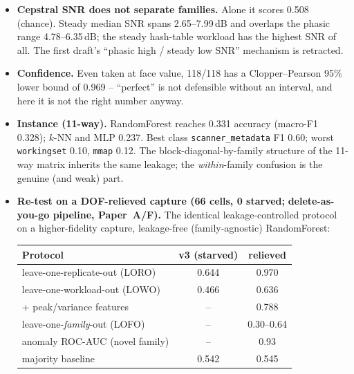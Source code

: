 \documentclass[conference]{IEEEtran}
\begin{document}
\begin{itemize}
        bootstrap puts agnostic accuracy at 0.645 with 95\% CI $[0.541, 0.746]$,
        whose lower bound coincides with the baseline -- so no ``genuine signal''
        claim is warranted (\texttt{robustness\_reanalysis.py}).
  \item \textbf{Cepstral SNR does not separate families.} Alone it scores 0.508
        (chance). Steady median SNR spans 2.65--7.99\,dB and overlaps the phasic
        range 4.78--6.35\,dB; the steady hash-table workload has the highest SNR
        of all. The first draft's ``phasic high / steady low SNR'' mechanism is
        retracted.
  \item \textbf{Confidence.} Even taken at face value, 118/118 has a
        Clopper--Pearson 95\% lower bound of 0.969 -- ``perfect'' is not
        defensible without an interval, and here it is not the right number
        anyway.
  \item \textbf{Instance (11-way).} RandomForest reaches 0.331 accuracy
        (macro-F1 0.328); $k$-NN and MLP 0.237. Best class
        \texttt{scanner\_metadata} F1 0.60; worst \texttt{workingset} 0.10,
        \texttt{mmap} 0.12. The block-diagonal-by-family structure of the 11-way
        matrix inherits the same leakage; the \emph{within}-family confusion is
        the genuine (and weak) part.
  \item \textbf{Re-test on a DOF-relieved capture (66 cells, 0 starved;}
        \textbf{delete-as-you-go pipeline, Paper~A/F).} The identical
        leakage-controlled protocol on a higher-fidelity capture, leakage-free
        (family-agnostic) RandomForest:
        \begin{center}
        \begin{tabular}{lcc}
          \toprule
          Protocol & v3 (starved) & relieved \\
          \midrule
          leave-one-replicate-out (LORO)        & 0.644 & 0.970 \\
          leave-one-workload-out (LOWO)         & 0.466 & 0.636 \\
          \quad + peak/variance features        & --    & 0.788 \\
          leave-one-\emph{family}-out (LOFO)    & --    & 0.30--0.64 \\
          anomaly ROC-AUC (novel family)        & --    & 0.93 \\
          majority baseline                     & 0.542 & 0.545 \\
          \bottomrule
        \end{tabular}

\end{center}
\end{itemize}
\end{document}
